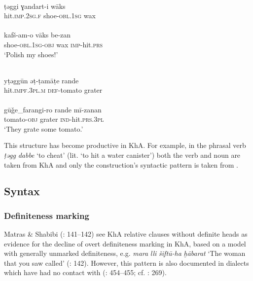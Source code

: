 \documentclass[output=paper,nonflat]{langsci/langscibook}
\begin{document}
\ea \label{taggi}
\\
\gll ṭəggi ɣandart-i wāks\\
     hit.\textsc{imp.2sg.f} shoe-\textsc{obl}.1\textsc{sg} wax\\
 
\\
\gll kafš-am-o vāks be-zan\\
     shoe-\textsc{obl.}1\textsc{sg-obj} wax \textsc{imp-}hit\textsc{.prs}\\
\glt ‘Polish my shoes!’
\z\z

\ea \label{tamate}
\\
\gll yṭəggūn əṭ-ṭamāṭe rande\\
     hit.\textsc{impf.3pl.m} \textsc{def}{}-tomato grater \\
 
\\
\gll gūǧe\_farangi-ro rande mī-zanan\\
     tomato-\textsc{obj} grater \textsc{ind}-hit\textsc{.prs.3pl} \\
\glt ‘They grate some tomato.’
\z\z

This structure has become productive in KhA. For example, in the phrasal verb \textit{ṭəgg} \textit{dabbe} ‘to cheat’ (lit. ‘to hit a water canister’) both the verb and noun are taken from KhA and only the construction’s syntactic pattern is taken from . 

\subsection{Syntax}
\subsubsection{Definiteness marking}

Matras \& Shabibi (\citeyear{MatrasShabibi2007}: 141–142) see KhA {relative} clauses without {definite} heads as evidence for the decline of overt {definiteness} marking in KhA, based on a  model with generally unmarked {definiteness}, e.g. \textit{mara} \textit{lli} \textit{šiftū-ha} \textit{ḫābarat} ‘The woman that you saw called’ (\citeyear{MatrasShabibi2007}: 142). However, this pattern is also documented in  dialects which have had no contact with  (\citealt{Pat-El2017}: 454–455; cf. \citealt{Procházka2018Fertile}: 269).
\end{document}
